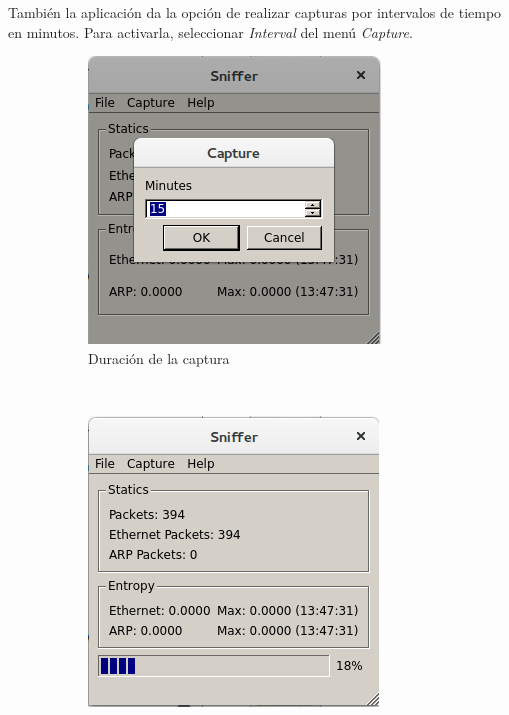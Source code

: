 También la aplicación da la opción de realizar capturas por intervalos de tiempo en minutos. Para activarla, seleccionar \emph{Interval} del menú \emph{Capture}.

\begin{figure}[h!]
        \centering
        \begin{subfigure}[b]{0.3\textwidth}
                \includegraphics[width=\textwidth]{graficos/tool/tool_interval}
                \caption{Duración de la captura}
        \end{subfigure}%
        ~ %
        \begin{subfigure}[b]{0.3\textwidth}
                \includegraphics[width=\textwidth]{graficos/tool/tool_progress}

\end{subfigure}
\end{figure}
